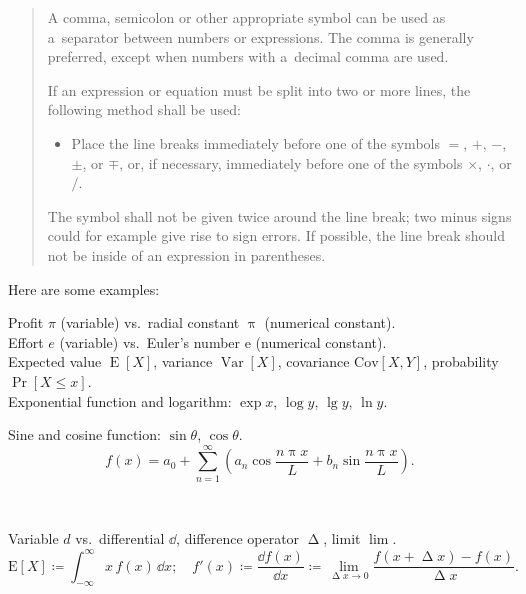 \begin{quotation}
	A comma, semicolon or other appropriate symbol can be used as a~separator between numbers or expressions. The comma is generally preferred, except when numbers with a~decimal comma are used. \par
	If an expression or equation must be split into two or more lines, the following method shall be used:
	\begin{itemize}[leftmargin = \baselineskip, labelsep = 0.25\baselineskip]
		\item[---] Place the line breaks immediately before one of the symbols $=$, $+$, $-$, $\pm$, or $\mp$, or, if necessary, immediately before one of the symbols $\times$, $\cdot$, or $/$.
	\end{itemize}
	The symbol shall not be given twice around the line break; two minus signs could for example give rise to sign errors. If possible, the line break should not be inside of an expression in parentheses.
\end{quotation}

Here are some examples:

\begin{longtblr}{}
	Profit $\pi$ (variable) vs.\ radial constant $\uppi$ (numerical constant). \\
	Effort $e$ (variable) vs.\ Euler's number $\mathrm{e}$ (numerical constant). \\
	Expected value $\operatorname{E}[X]$, variance $\operatorname{Var}[X]$, covariance $\mathrm{Cov}[X, Y]$, probability $\Pr[{X \le x}]$. \\
	Exponential function and logarithm: $\exp x$, $\log y$, $\lg y$, $\ln y$. \\
	\begin{minipage}{\linewidth}\noindent%
		Sine and cosine function: $\sin \theta$, $\cos \theta$.
		\begin{equation}
			f(x) = a_0 + \sum_{n=1}^\infty \left(a_n \cos \frac{n \uppi x}{L} + b_n \sin \frac{n \uppi x}{L} \right).
		\end{equation}
	\end{minipage} \\
	\begin{minipage}{\linewidth}\noindent%
		Variable $d$ vs.\ differential $\dd$, difference operator $\upDelta$, limit $\lim$.
		\begin{equation}
			\mathrm{E}[X] \coloneq \int_{-\infty}^{\infty} x\,f(x)\,\dd x; \quad
			f'(x) \coloneq \frac{\dd f(x)}{\dd x} \coloneq \lim_{\upDelta x \to 0} \frac{f(x + \upDelta x) - f(x)}{\upDelta x}.
		\end{equation}
	\end{minipage}\vspace{0.333\smallskipamount}
\end{longtblr}

